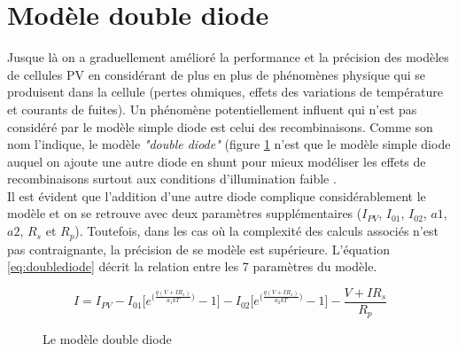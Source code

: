\section{Modèle double diode}

Jusque là on a graduellement amélioré la performance et la précision des modèles de cellules PV en considérant de plus en plus de phénomènes physique qui se produisent dans la cellule (pertes ohmiques, effets des variations de température et courants de fuites). Un phénomène potentiellement influent qui n'est pas considéré par le modèle simple diode est celui des recombinaisons. Comme son nom l'indique, le modèle \textit{"double diode"} (figure \ref{fig:doublediode} n'est que le modèle simple diode auquel on ajoute une autre diode en shunt pour mieux modéliser les effets de recombinaisons surtout aux conditions d'illumination faible \cite{Chin2015b}.\\
Il est évident que l'addition d'une autre diode complique considérablement le modèle et on se retrouve avec deux paramètres supplémentaires ($I_{PV}$, $I_{01}$, $I_{02}$, $a1$, $a2$, $R_s$ et $R_p$). Toutefois, dans les cas où la complexité des calculs associés n'est pas contraignante, la précision de se modèle est supérieure. L'équation \ref{eq:doublediode} décrit la relation entre les 7 paramètres du modèle.

\begin{equation}
  \label{eq:doublediode}
  I = I_{PV} - I_{01} \bigg[e^{\big(\frac{q(V + IR_s)}{a_1kT}\big)} - 1\bigg] - I_{02} \bigg[e^{\big(\frac{q(V + IR_s)}{a_2kT}\big)} - 1\bigg] - \frac{V + I R_s}{R_p}
\end{equation}

\begin{figure}[b]
  \begin{center}
    \shorthandoff{:!}
    \shorthandon{:!}
    \caption{Le modèle double diode}
    \label{fig:doublediode}
  \end{center}
\end{figure}

